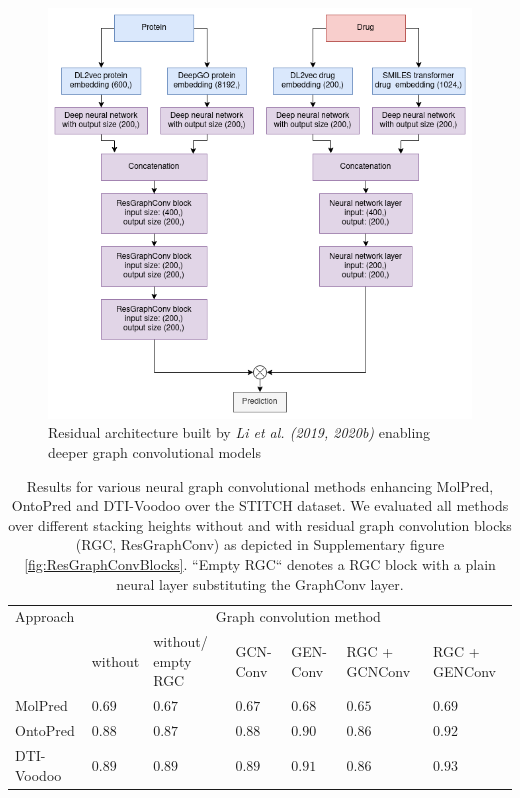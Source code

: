 \documentclass[]{article}
\newcommand{\name}{DTI-Voodoo}
\begin{document}
\begin{figure}[ht]%
	\centerline{\includegraphics[width=1\columnwidth]{../figures/full_model_all_layers.png}}
	\caption{Residual architecture built by \textit{Li et al. (2019, 2020b)} enabling deeper graph convolutional models}
	\label{fig:FullModelAllLayers}
\end{figure}

\begin{table}[ht]
	\centering

	\begin{tabular}{|p{2.0cm}|p{1.1cm}|p{1.2cm}|p{0.8cm}|p{0.8cm}|p{1.2cm}|p{1.2cm}|}
		\hline
		Approach&\multicolumn{6}{c|}{Graph convolution method}\\
		&without&without/ empty RGC&GCN-Conv&GEN-Conv&RGC + GCNConv&RGC + GENConv\\
		\hline
		MolPred & $0.69$ & $0.67$& $0.67$& $0.68$& $0.65$& $0.69$\\
		\hline
		OntoPred &$0.88$ &$0.87$ &$0.88$&$0.90$&$0.86$&$0.92$\\
		\hline
		\name& $0.89$&$0.89$& $0.89$& $0.91$& $0.86$& $\mathbf{0.93}$\\
		\hline
	\end{tabular}
	\caption{\label{tab:Results}Results for various neural graph convolutional methods enhancing MolPred, OntoPred and \name{} over the STITCH dataset. We evaluated all methods over different stacking heights without and with residual graph convolution blocks (RGC, ResGraphConv) as depicted in Supplementary figure \ref{fig:ResGraphConvBlocks}. ``Empty RGC`` denotes a RGC block with a plain neural layer substituting the GraphConv layer.}
\end{table}
\end{document}
